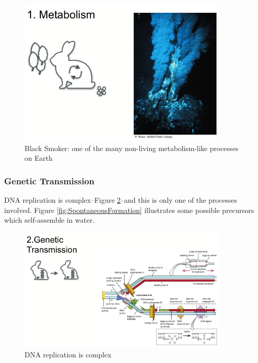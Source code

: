 \documentclass[]{article}
\begin{document}
\begin{figure}[H]
	\caption{Black Smoker: one of the many non-living metabolism-like processes on Earth}\label{fig:BlackSmoker}
	\includegraphics[width=0.9\textwidth]{BlackSmoker}
\end{figure}

\subsubsection{Genetic Transmission}

DNA replication is complex--Figure \ref{fig:DNA_replication_complex}--and this is only one of the processes involved. Figure \ref{fig:SpontaneousFormation}\cite{cafferty2016spontaneous} illustrates some possible precursors which self-assemble in water. 
\begin{figure}[H]
	\caption{DNA replication is complex}\label{fig:DNA_replication_complex}
	\includegraphics[width=0.9\textwidth]{DNA_replication_complex}
\end{figure}
\end{document}
